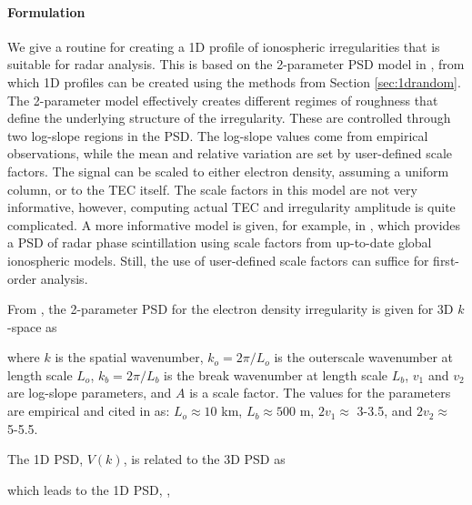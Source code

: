 \paragraph{Formulation} We give a routine for creating a 1D profile of ionospheric irregularities that is suitable for radar analysis. This is based on the 2-parameter PSD model in \cite{liu2003ionospheric,ishimaru1999ionospheric}, from which 1D profiles can be created using the methods from Section \ref{sec:1drandom}. The 2-parameter model effectively creates different regimes of roughness that define the underlying structure of the irregularity. These are controlled through two log-slope regions in the PSD. The log-slope values come from empirical observations, while the mean and relative variation are set by user-defined scale factors. The signal can be scaled to either electron density, assuming a uniform column, or to the TEC itself. The scale factors in this model are not very informative, however, computing actual TEC and irregularity amplitude is quite complicated. A more informative model is given, for example, in \cite{rogers2013impacts}, which provides a PSD of radar phase scintillation using scale factors from up-to-date global ionospheric models. Still, the use of user-defined scale factors can suffice for first-order analysis.

From \cite{liu2003ionospheric,ishimaru1999ionospheric}, the 2-parameter PSD for the electron density irregularity is given for 3D $k$-space as 

\noindent where $k$ is the spatial wavenumber, $k_o = 2\pi/L_o$ is the outerscale wavenumber at length scale $L_o$, $k_b = 2\pi/L_b$ is the break wavenumber at length scale $L_b$, $v_1$ and $v_2$ are log-slope parameters, and $A$ is a scale factor. The values for the parameters are empirical and cited in \cite{ishimaru1999ionospheric} as: $L_o \approx 10$ km, $L_b \approx 500$ m, $2v_1\approx$  3-3.5, and $2v_2\approx$  5-5.5.  

The 1D PSD, $V(k)$, is related to the 3D PSD as \cite{ishimaru1978wave}

which leads to the 1D PSD, \cite{liu2003ionospheric}, 

